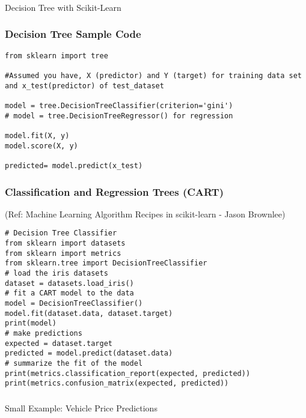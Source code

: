\begin{frame}[fragile]\frametitle{}
\begin{center}
{\Large Decision Tree with Scikit-Learn}
\end{center}
\end{frame}

\begin{frame}[fragile]\frametitle{Decision Tree Sample Code}
\begin{lstlisting}
from sklearn import tree 

#Assumed you have, X (predictor) and Y (target) for training data set and x_test(predictor) of test_dataset 

model = tree.DecisionTreeClassifier(criterion='gini') 
# model = tree.DecisionTreeRegressor() for regression 

model.fit(X, y) 
model.score(X, y) 

predicted= model.predict(x_test) 
\end{lstlisting}
\end{frame}


\begin{frame}[fragile]\frametitle{Classification and Regression Trees (CART)}
{\tiny (Ref: Machine Learning Algorithm Recipes in scikit-learn - Jason Brownlee)}

\begin{lstlisting}
# Decision Tree Classifier
from sklearn import datasets
from sklearn import metrics
from sklearn.tree import DecisionTreeClassifier
# load the iris datasets
dataset = datasets.load_iris()
# fit a CART model to the data
model = DecisionTreeClassifier()
model.fit(dataset.data, dataset.target)
print(model)
# make predictions
expected = dataset.target
predicted = model.predict(dataset.data)
# summarize the fit of the model
print(metrics.classification_report(expected, predicted))
print(metrics.confusion_matrix(expected, predicted))
\end{lstlisting}


\end{frame}



\begin{frame}[fragile]\frametitle{}
\begin{center}
{\Large Small Example: Vehicle Price Predictions}
\end{center}
\end{frame}


